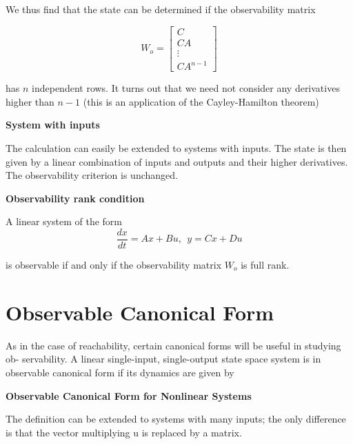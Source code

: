 We thus find that the state can  be  determined if the observability matrix
 
\begin{equation}
W_o= 
\begin{bmatrix}
 C \\
 CA \\
 \vdots \\
 CA^{n-1} 
\end{bmatrix}
\end{equation}

has $n$ independent rows.  It turns out  that  we  need  not consider any derivatives higher
than $n-1$ (this is an application of the Cayley-Hamilton theorem)
 
\begin{framed}
\theoremstyle{remark}
\begin{remark}{\textbf{System with inputs}}

The calculation can easily be extended to systems with inputs. The state is then
given by a linear combination of inputs and outputs and their higher derivatives.
The observability criterion is unchanged. 
\end{remark}
\end{framed}


\begin{framed}
\theoremstyle{theorem}
\begin{theorem}{\textbf{Observability rank condition}}

A linear system of the form  
\begin{equation}
\frac{dx}{dt} = Ax + Bu, ~~ y = Cx + Du \nonumber
\end{equation}

is observable if and only if the observability matrix $W_o$ is full rank.
\end{theorem}
\end{framed}

\section{Observable Canonical Form}
\label{observability_canonical_form}

As in the case of reachability, certain canonical forms will be useful in studying ob-
servability. A linear single-input, single-output state space system is in observable
canonical form if its dynamics are given by


\begin{framed}
\theoremstyle{remark}
\begin{remark}{\textbf{Observable Canonical Form for Nonlinear Systems}}

The definition can be extended to systems with many inputs; the only difference is
that the vector multiplying u is replaced by a matrix.
\end{remark}
\end{framed}


